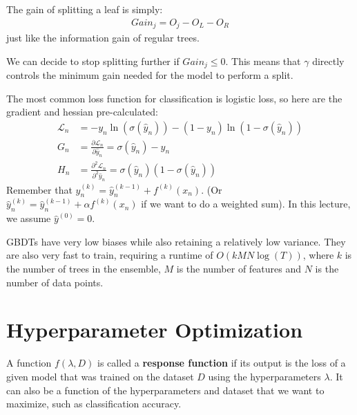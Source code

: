 \documentclass{report}
\newcommand{\tbf}{\textbf}
\newcommand{\pd}[2]{\frac{\partial #1}{\partial #2}}
\newcommand*{\newpar}{\par\vspace{\baselineskip}\noindent}
\newcommand{\loss}{\mathcal{L}}
\newcommand{\yhat}{\hat{y}}
\begin{document}
\newpar
The gain of splitting a leaf is simply:
\begin{align}
 Gain_j = O_j - O_L - O_R
\end{align}
just like the information gain of regular trees.
\newpar
We can decide to stop splitting further if $Gain_j \leq 0$. This means that $\gamma$ directly controls the minimum gain needed for the model to perform a split.
\newpar
The most common loss function for classification is logistic loss, so here are the gradient and hessian pre-calculated:
\begin{align}
 \loss_n &= -y_n \ln(\sigma(\yhat_n)) - (1-y_n)\ln(1-\sigma(\yhat_n))\\
 G_n &= \pd{\loss_n}{\yhat_n} = \sigma(\yhat_n) - y_n\\
 H_n &= \pd{^2 \loss_n}{^2\yhat_n} = \sigma(\yhat_n)(1 - \sigma(\yhat_n))
\end{align}
Remember that $\yhat_n^{(k)} = \yhat_n^{(k-1)} + f^{(k)}(x_n)$. (Or $\yhat_n^{(k)} = \yhat_n^{(k-1)} + \alpha f^{(k)}(x_n)$ if we want to do a weighted sum). In this lecture, we assume $\yhat^{(0)} = 0$.
\newpar
GBDTs have very low biases while also retaining a relatively low variance. They are also very fast to train, requiring a runtime of $O(kMN \log(T))$, where $k$ is the number of trees in the ensemble, $M$ is the number of features and $N$ is the number of data points.
%
\chapter{Hyperparameter Optimization}
A function $f(\lambda, D)$ is called a \tbf{response function} if its output is the loss of a given model that was trained on the dataset $D$ using the hyperparameters $\lambda$. It can also be a function of the hyperparameters and dataset that we want to maximize, such as classification accuracy.
%
\end{document}
